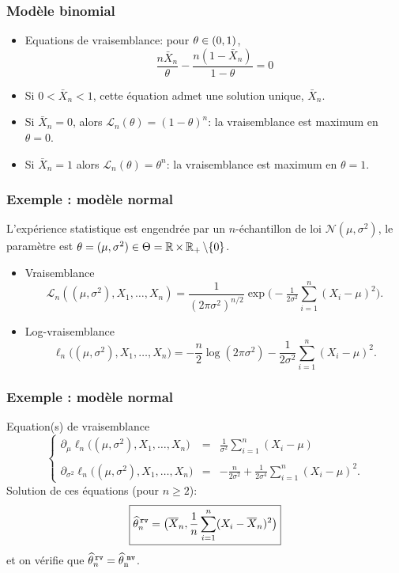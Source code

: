 \begin{frame}
\frametitle{Modèle binomial}
\begin{itemize}
\item \alert{Equations de vraisemblance}: pour $\theta \in \left(0,1\right)$,
$$
\frac{n \bar{X}_n}{\theta} - \frac{n(1-\bar{X}_n)}{1-\theta}= 0
$$
\item Si $0 < \bar{X}_n < 1$, cette équation admet une solution unique, $\bar{X}_n$.
\item Si $\bar{X}_n=0$, alors $\mathcal{L}_n(\theta)= (1-\theta)^n$: la vraisemblance est maximum en $\theta=0$.
\item Si $\bar{X}_n=1$ alors $\mathcal{L}_n(\theta)= \theta^n$: la vraisemblance est maximum en $\theta=1$.
\end{itemize}
\end{frame}

\begin{frame}
\frametitle{Exemple : modèle normal } L'expérience statistique est
engendrée par un $n$-échantillon de loi ${\mathcal
N}(\mu,\sigma^2)$, le paramètre est $\theta = (\mu,\sigma^2)\in
\Theta = \operatorname{{\mathbb R}}\times \operatorname{{\mathbb R}}_+\setminus\{0\}$.
\begin{itemize}
\item
\alert{Vraisemblance} $${\mathcal L}_n((\mu,\sigma^2),
X_1,\ldots, X_n) =
\frac1{(2\pi\sigma^2)^{n/2}}\exp\big(-\tfrac{1}{2\sigma^2}
\sum_{i=1}^n(X_i-\mu)^2\big).$$
\item \alert{Log-vraisemblance}
$$\ell_n\big((\mu,\sigma^2),X_1,\ldots, X_n\big) = -\frac{n}{2}
\log(2\pi \sigma^2)-\frac{1}{2\sigma^2}\sum_{i = 1}^n (X_i-\mu)^2.$$
\end{itemize}
\end{frame}

\begin{frame}
\frametitle{Exemple : modèle normal }
\alert{Equation(s) de vraisemblance}
$$
\left\{
\begin{array}{lll}
\partial_\mu\ell_n \big((\mu,\sigma^2),X_1,\ldots, X_n\big) & = &\displaystyle\frac{1}{\sigma^2}\sum_{i = 1}^n (X_i-\mu) \\ \\
\partial_{\sigma^2}\ell_n \big((\mu,\sigma^2),X_1,\ldots, X_n\big)&
 = &\displaystyle -\frac{n}{2\sigma^2}+\frac{1}{2\sigma^4}
 \sum_{i = 1}^n (X_i-\mu)^2.
\end{array}
\right.
$$
Solution de ces \'equations (pour $n \geq 2$):
$$\boxed{\widehat
\theta_n^{\,{\tt rv}} = \big(\overline{X}_n,\frac{1}{n} \sum_{i =
1}^n(X_i-\overline{X}_n)^2\big)}$$ et on vérifie que $\widehat
\theta_n^{\,{\tt rv}} =\operatorname{\widehat \theta_n^{\,\,{\tt mv}}}$.
\end{frame}



